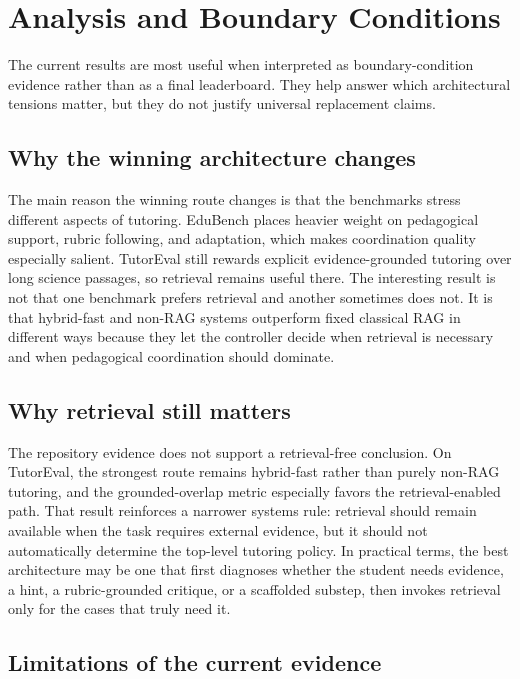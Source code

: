 \section{Analysis and Boundary Conditions}

The current results are most useful when interpreted as boundary-condition evidence rather than as a final leaderboard. They help answer which architectural tensions matter, but they do not justify universal replacement claims.

\subsection{Why the winning architecture changes}

The main reason the winning route changes is that the benchmarks stress different aspects of tutoring. EduBench places heavier weight on pedagogical support, rubric following, and adaptation, which makes coordination quality especially salient. TutorEval still rewards explicit evidence-grounded tutoring over long science passages, so retrieval remains useful there. The interesting result is not that one benchmark prefers retrieval and another sometimes does not. It is that hybrid-fast and non-RAG systems outperform fixed classical RAG in different ways because they let the controller decide when retrieval is necessary and when pedagogical coordination should dominate.

\subsection{Why retrieval still matters}

The repository evidence does not support a retrieval-free conclusion. On TutorEval, the strongest route remains hybrid-fast rather than purely non-RAG tutoring, and the grounded-overlap metric especially favors the retrieval-enabled path. That result reinforces a narrower systems rule: retrieval should remain available when the task requires external evidence, but it should not automatically determine the top-level tutoring policy. In practical terms, the best architecture may be one that first diagnoses whether the student needs evidence, a hint, a rubric-grounded critique, or a scaffolded substep, then invokes retrieval only for the cases that truly need it.

\subsection{Limitations of the current evidence}

